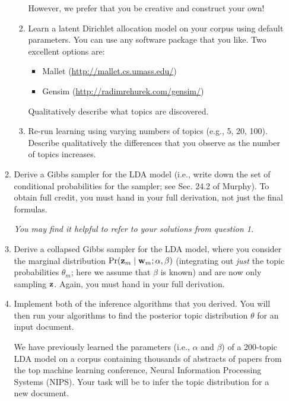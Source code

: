 \documentclass{article}
\begin{document}
\begin{enumerate}
\begin{enumerate}
\begin{enumerate}
However, we prefer that you be creative and construct your own!

\item Learn a latent Dirichlet allocation model on your corpus using
  default parameters. You can use any software package that you like. Two excellent
  options are:
\begin{itemize}
\item Mallet (\url{http://mallet.cs.umass.edu/})
\item Gensim (\url{http://radimrehurek.com/gensim/})
\end{itemize}
Qualitatively describe what topics are discovered.

\item Re-run learning using varying numbers of topics (e.g., 5, 20,
  100). Describe qualitatively the differences that you observe 
  as the number of topics increases.
\end{enumerate}

\item Derive a Gibbs sampler for the LDA model (i.e., write down the
set of conditional probabilities for the sampler; see Sec. 24.2 of
Murphy). To obtain full credit, you must hand in your full derivation,
not just the final formulas.

{\em You may find it helpful to refer to your solutions from question 1.}

\item Derive a collapsed Gibbs sampler for the LDA model,
  where you consider the marginal distribution $\Pr({\bf z}_m \mid
  {\bf w}_m ; \alpha, \beta)$ (integrating out {\em just} the topic probabilities
  $\theta_m$; here we assume that $\beta$ is known) and are now only sampling ${\bf z}$. Again, you must
  hand in your full derivation.

\item 
Implement both of the inference algorithms that you derived. You will then run your algorithms to find the posterior topic distribution $\theta$ for an input document.

We have previously learned the parameters (i.e., $\alpha$ and $\beta$) of a 200-topic LDA model on a corpus containing thousands of abstracts of papers from the top machine learning conference, Neural Information Processing Systems (NIPS). Your task will be to infer the topic distribution for a new document.


\end{enumerate}
\end{enumerate}
\end{document}
